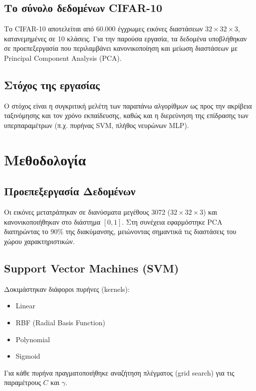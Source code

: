 \documentclass[11pt,a4paper]{article}
\begin{document}
\subsection{Το σύνολο δεδομένων CIFAR-10}
Το \textenglish{CIFAR-10} αποτελείται από 60.000 έγχρωμες εικόνες διαστάσεων $32 \times 32 \times 3$, κατανεμημένες σε 10 κλάσεις. Για την παρούσα εργασία, τα δεδομένα υποβλήθηκαν σε προεπεξεργασία που περιλαμβάνει κανονικοποίηση και μείωση διαστάσεων με \textenglish{Principal Component Analysis (PCA)}.

\subsection{Στόχος της εργασίας}
Ο στόχος είναι η συγκριτική μελέτη των παραπάνω αλγορίθμων ως προς την ακρίβεια ταξινόμησης και τον χρόνο εκπαίδευσης, καθώς και η διερεύνηση της επίδρασης των υπερπαραμέτρων (π.χ. πυρήνας SVM, πλήθος νευρώνων MLP).

\newpage

\section{Μεθοδολογία}

\subsection{Προεπεξεργασία Δεδομένων}
Οι εικόνες μετατράπηκαν σε διανύσματα μεγέθους 3072 ($32 \times 32 \times 3$) και κανονικοποιήθηκαν στο διάστημα $[0, 1]$. Στη συνέχεια εφαρμόστηκε \textenglish{PCA} διατηρώντας το 90\% της διακύμανσης, μειώνοντας σημαντικά τις διαστάσεις του χώρου χαρακτηριστικών.

\subsection{Support Vector Machines (SVM)}
Δοκιμάστηκαν διάφοροι πυρήνες (\textenglish{kernels}):
\begin{itemize}
    \item \textenglish{Linear}
    \item \textenglish{RBF (Radial Basis Function)}
    \item \textenglish{Polynomial}
    \item \textenglish{Sigmoid}
\end{itemize}
Για κάθε πυρήνα πραγματοποιήθηκε αναζήτηση πλέγματος (\textenglish{grid search}) για τις παραμέτρους $C$ και $\gamma$.
\end{document}
